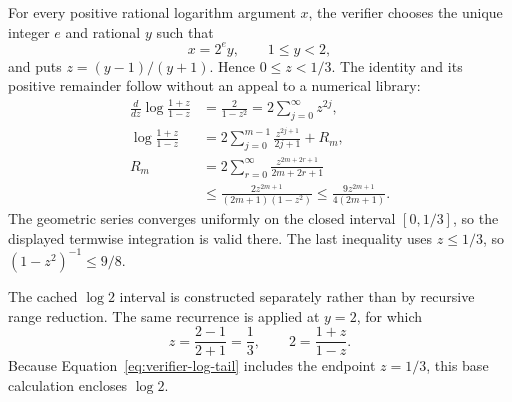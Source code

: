 \documentclass[11pt]{article}
\theoremstyle{definition}
\begin{document}
For every positive rational logarithm argument $x$, the verifier chooses the unique integer $e$
and rational $y$ such that
\[
  x=2^e y,\qquad 1\le y<2,
\]
and puts $z=(y-1)/(y+1)$.  Hence $0\le z<1/3$.  The identity and its positive
remainder follow without an appeal to a numerical library:
\begin{align}
  \frac{d}{dz}\log\frac{1+z}{1-z}
    &=\frac{2}{1-z^2}
      =2\sum_{j=0}^{\infty}z^{2j},\\
  \log\frac{1+z}{1-z}
    &=2\sum_{j=0}^{m-1}\frac{z^{2j+1}}{2j+1}+R_m,\\
  R_m
    &=2\sum_{r=0}^{\infty}
      \frac{z^{2m+2r+1}}{2m+2r+1}\\
    &\le
      \frac{2z^{2m+1}}{(2m+1)(1-z^2)}
      \le
      \frac{9z^{2m+1}}{4(2m+1)}.
      \label{eq:verifier-log-tail}
\end{align}
The geometric series converges uniformly on the closed interval \([0,1/3]\), so the displayed
termwise integration is valid there.  The last inequality uses $z\le1/3$, so
$(1-z^2)^{-1}\le9/8$.

The cached \(\log2\) interval is constructed separately rather than by recursive range reduction.
The same recurrence is applied at \(y=2\), for which
\[
  z=\frac{2-1}{2+1}=\frac13,\qquad
  2=\frac{1+z}{1-z}.
\]
Because Equation~\eqref{eq:verifier-log-tail} includes the endpoint \(z=1/3\), this base
calculation encloses \(\log2\).
\end{document}
